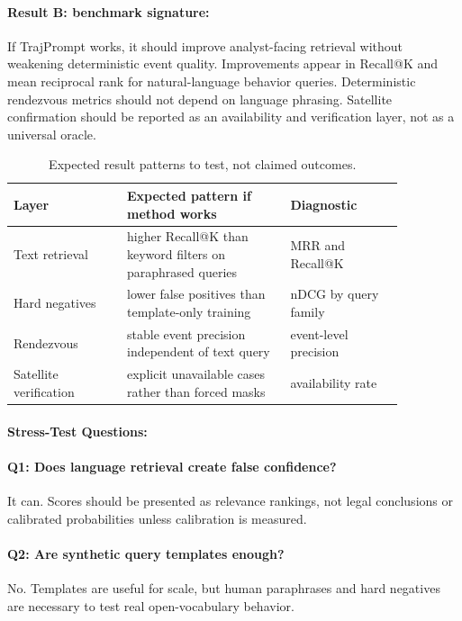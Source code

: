 \documentclass{article}
\begin{document}
\paragraph{Result B: benchmark signature:}

If TrajPrompt works, it should improve analyst-facing retrieval without weakening deterministic event quality. Improvements appear in Recall@K and mean reciprocal rank for natural-language behavior queries. Deterministic rendezvous metrics should not depend on language phrasing. Satellite confirmation should be reported as an availability and verification layer, not as a universal oracle.

\begin{table}[t]
\centering
\caption{Expected result patterns to test, not claimed outcomes.}
\begin{tabular}{@{}p{0.25\linewidth}p{0.36\linewidth}p{0.25\linewidth}@{}}
\toprule
\textbf{Layer} & \textbf{Expected pattern if method works} & \textbf{Diagnostic}\\
\midrule
Text retrieval & higher Recall@K than keyword filters on paraphrased queries & MRR and Recall@K\\
Hard negatives & lower false positives than template-only training & nDCG by query family\\
Rendezvous & stable event precision independent of text query & event-level precision\\
Satellite verification & explicit unavailable cases rather than forced masks & availability rate\\
\bottomrule
\end{tabular}
\end{table}

\paragraph{Stress-Test Questions:}

\paragraph{Q1: Does language retrieval create false confidence?}
It can. Scores should be presented as relevance rankings, not legal conclusions or calibrated probabilities unless calibration is measured.

\paragraph{Q2: Are synthetic query templates enough?}
No. Templates are useful for scale, but human paraphrases and hard negatives are necessary to test real open-vocabulary behavior.
\end{document}
